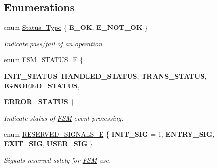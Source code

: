 \subsection*{Enumerations}
\begin{DoxyCompactItemize}
\item 
enum \hyperlink{group___f_s_m_ga3ef97600b5131dbf1b9a798e760e9268}{Status\_\-Type} \{ {\bfseries E\_\-OK}, 
{\bfseries E\_\-NOT\_\-OK}
 \}
\begin{DoxyCompactList}\small\item\em Indicate pass/fail of an operation. \end{DoxyCompactList}\item 
enum \hyperlink{group___f_s_m_ga64d3de8a4121adac058d8a5e116d9b7d}{FSM\_\-STATUS\_\-E} \{ \par
{\bfseries INIT\_\-STATUS}, 
{\bfseries HANDLED\_\-STATUS}, 
{\bfseries TRANS\_\-STATUS}, 
{\bfseries IGNORED\_\-STATUS}, 
\par
{\bfseries ERROR\_\-STATUS}
 \}
\begin{DoxyCompactList}\small\item\em Indicate status of \hyperlink{struct_f_s_m}{FSM} event processing. \end{DoxyCompactList}\item 
enum \hyperlink{group___f_s_m_gaa18f09911d1d3609aa83e3383f3f6bfe}{RESERVED\_\-SIGNALS\_\-E} \{ {\bfseries INIT\_\-SIG} =  1, 
{\bfseries ENTRY\_\-SIG}, 
{\bfseries EXIT\_\-SIG}, 
{\bfseries USER\_\-SIG}
 \}
\begin{DoxyCompactList}\small\item\em Signals reserved solely for \hyperlink{struct_f_s_m}{FSM} use. \end{DoxyCompactList}\end{DoxyCompactItemize}
